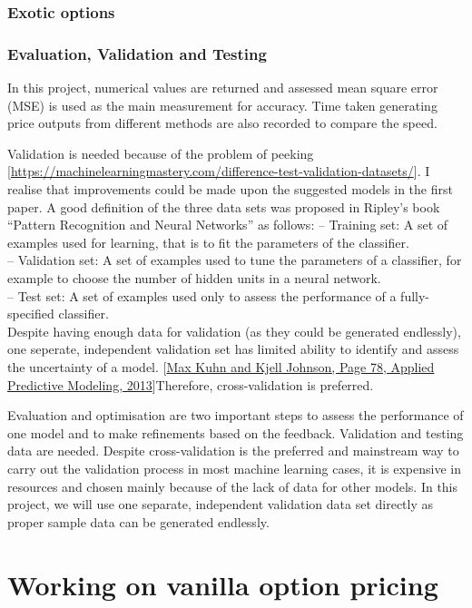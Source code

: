 \documentclass{report}
\begin{document}
\subsection{Exotic options}

\subsection{Evaluation, Validation and Testing}
In this project, numerical values are returned and assessed mean square error (MSE) is used as the main measurement for accuracy. Time taken generating price outputs from different methods are also recorded to compare the speed.

Validation is needed because of the problem of peeking [\url{https://machinelearningmastery.com/difference-test-validation-datasets/}]. I realise that improvements could be made upon the suggested models in the first paper. 
A good definition of the three data sets was proposed in Ripley’s book “Pattern Recognition and Neural Networks” as follows:
– Training set: A set of examples used for learning, that is to fit the parameters of the classifier.\\
– Validation set: A set of examples used to tune the parameters of a classifier, for example to choose the number of hidden units in a neural network.\\
– Test set: A set of examples used only to assess the performance of a fully-specified classifier.\\
Despite having enough data for validation (as they could be generated endlessly), one seperate, independent validation set has limited ability to identify and assess the uncertainty of a model. [\url{Max Kuhn and Kjell Johnson, Page 78, Applied Predictive Modeling, 2013}]Therefore, cross-validation is preferred.

Evaluation and optimisation are two important steps to assess the performance of one model and to make refinements based on the feedback. Validation and testing data are needed. 
Despite cross-validation is the preferred and mainstream way to carry out the validation process in most machine learning cases, it is expensive in resources and chosen mainly because of the lack of data for other models. In this project, we will use one separate, independent validation data set directly as proper sample data can be generated endlessly. 


\chapter{Working on vanilla option pricing}
\end{document}
